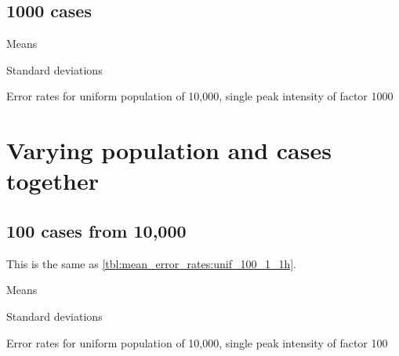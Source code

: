 \subsection{1000 cases}
\begin{table}[H]
\centering
\scriptsize

    \begin{subtable}{0.5\textwidth}
    
    \caption{Means} 
    \end{subtable}%
    \begin{subtable}{0.5\textwidth}
    
    \caption{Standard deviations} 
    \end{subtable}

\caption{Error rates for uniform population of 10,000, single peak intensity of factor 1000}
\label{tbl:mean_error_rates:unif_1000_1_1h}
\end{table}


\section{Varying population and cases together}

\subsection{100 cases from 10,000}

This is the same as \cref{tbl:mean_error_rates:unif_100_1_1h}.

\begin{table}[H]
\centering
\scriptsize

    \begin{subtable}{0.5\textwidth}
    
    \caption{Means} 
    \end{subtable}%
    \begin{subtable}{0.5\textwidth}
    
    \caption{Standard deviations} 
    \end{subtable}

\caption{Error rates for uniform population of 10,000, single peak intensity of factor 100}
\label{tbl:mean_error_rates:unif_100_1_1h:2}
\end{table}

